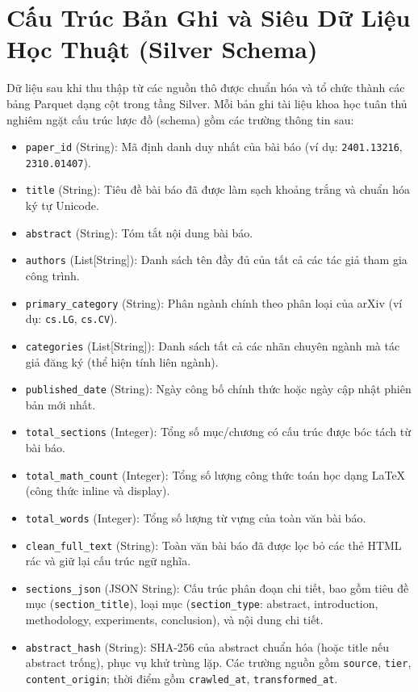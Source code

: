 \section{Cấu Trúc Bản Ghi và Siêu Dữ Liệu Học Thuật (Silver Schema)}

Dữ liệu sau khi thu thập từ các nguồn thô được chuẩn hóa và tổ chức thành các bảng Parquet dạng cột trong tầng Silver. Mỗi bản ghi tài liệu khoa học tuân thủ nghiêm ngặt cấu trúc lược đồ (schema) gồm các trường thông tin sau:

\begin{itemize}
  \item \texttt{paper\_id} (String): Mã định danh duy nhất của bài báo (ví dụ: \texttt{2401.13216}, \texttt{2310.01407}).
  \item \texttt{title} (String): Tiêu đề bài báo đã được làm sạch khoảng trắng và chuẩn hóa ký tự Unicode.
  \item \texttt{abstract} (String): Tóm tắt nội dung bài báo.
  \item \texttt{authors} (List[String]): Danh sách tên đầy đủ của tất cả các tác giả tham gia công trình.
  \item \texttt{primary\_category} (String): Phân ngành chính theo phân loại của arXiv (ví dụ: \texttt{cs.LG}, \texttt{cs.CV}).
  \item \texttt{categories} (List[String]): Danh sách tất cả các nhãn chuyên ngành mà tác giả đăng ký (thể hiện tính liên ngành).
  \item \texttt{published\_date} (String): Ngày công bố chính thức hoặc ngày cập nhật phiên bản mới nhất.
  \item \texttt{total\_sections} (Integer): Tổng số mục/chương có cấu trúc được bóc tách từ bài báo.
  \item \texttt{total\_math\_count} (Integer): Tổng số lượng công thức toán học dạng LaTeX (công thức inline và display).
  \item \texttt{total\_words} (Integer): Tổng số lượng từ vựng của toàn văn bài báo.
  \item \texttt{clean\_full\_text} (String): Toàn văn bài báo đã được lọc bỏ các thẻ HTML rác và giữ lại cấu trúc ngữ nghĩa.
  \item \texttt{sections\_json} (JSON String): Cấu trúc phân đoạn chi tiết, bao gồm tiêu đề mục (\texttt{section\_title}), loại mục (\texttt{section\_type}: abstract, introduction, methodology, experiments, conclusion), và nội dung chi tiết.
  \item \texttt{abstract\_hash} (String): SHA-256 của abstract chuẩn hóa (hoặc title nếu abstract trống), phục vụ khử trùng lặp. Các trường nguồn gồm \texttt{source}, \texttt{tier}, \texttt{content\_origin}; thời điểm gồm \texttt{crawled\_at}, \texttt{transformed\_at}.
\end{itemize}

